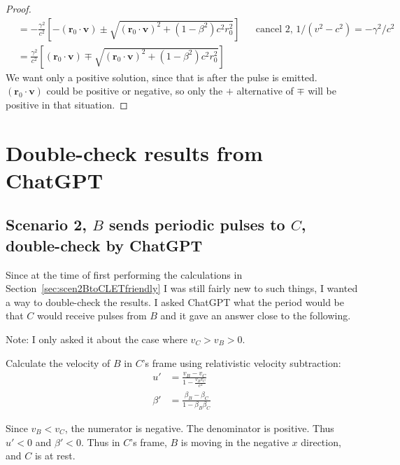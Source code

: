 \documentclass[a4paper]{article}
\theoremstyle{plain}
\theoremstyle{definition}
\newcommand{\vect}[1]{\mathbf{#1}}
\begin{document}
\begin{proof}
\begin{align*}
  & = -\frac{\gamma^2}{c^2} \left[ -(\vect{r}_0 \cdot \vect{v}) \pm \sqrt{(\vect{r}_0 \cdot \vect{v})^2 + (1-\beta^2)c^2 r_0^2} \right] & & \text{cancel 2, $1/(v^2-c^2) = -\gamma^2/c^2$} \\
  & = \frac{\gamma^2}{c^2} \left[ (\vect{r}_0 \cdot \vect{v}) \mp \sqrt{(\vect{r}_0 \cdot \vect{v})^2 + (1-\beta^2)c^2 r_0^2} \right]
\end{align*}
We want only a positive solution, since that is after the pulse is
emitted.  $(\vect{r}_0 \cdot \vect{v})$ could be positive or negative,
so only the $+$ alternative of $\mp$ will be positive in that
situation.
\end{proof}


\section{Double-check results from ChatGPT}


\subsection{Scenario 2, $B$ sends periodic pulses to $C$, double-check by ChatGPT}
\label{sec:scen2BtoCdoublecheck}

Since at the time of first performing the calculations in
Section~\ref{sec:scen2BtoCLETfriendly} I was still fairly new to
such things, I wanted a way to double-check the results.  I asked
ChatGPT what the period would be that $C$ would receive pulses from
$B$ and it gave an answer close to the following.

Note: I only asked it about the case where $v_C > v_B > 0$.

Calculate the velocity of $B$ in $C$'s frame using relativistic
velocity subtraction:
\begin{align}
u' & = \frac{v_B - v_C}{1 - \frac{v_B v_C}{c^2}} \\
\beta' & = \frac{\beta_B - \beta_C}{1 - \beta_B \beta_C}
\end{align}

Since $v_B < v_C$, the numerator is negative.  The denominator is
positive.  Thus $u' < 0$ and $\beta' < 0$.  Thus in $C$'s frame, $B$
is moving in the negative $x$ direction, and $C$ is at rest.
\end{document}
